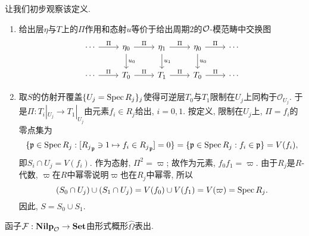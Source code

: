 让我们初步观察该定义.\begin{enumerate}
    \item 给出层$\eta$与$T$上的$\Pi$作用和态射$u$等价于给出周期$2$的$\mathcal{O}$-模范畴中交换图\[
    \begin{tikzcd}
    \cdots \arrow[r, "\Pi"] & \eta_0 \arrow[r, "\Pi"] \arrow[d, "u_0"] & \eta_1 \arrow[r, "\Pi"] \arrow[d, "u_1"] & \eta_0 \arrow[r, "\Pi"] \arrow[d, "u_0"] & \cdots \\
    \cdots \arrow[r, "\Pi"] & T_0 \arrow[r, "\Pi"]                     & T_1 \arrow[r, "\Pi"]                     & T_0 \arrow[r, "\Pi"]                     & \cdots
    \end{tikzcd}\]
    \item 取$S$的仿射开覆盖$\{U_j = \operatorname{Spec} R_j\}_j$使得可逆层$T_0$与$T_1$限制在$U_j$上同构于$\mathscr{O}_{U_j}$.
    于是$\Pi : T_i|_{U_j}\to T_1|_{U_j}$由元素$f_i\in R_j$给出, $i = 0, 1$. 按定义, 限制在$U_j$上, $\Pi = f_i$的零点集为\begin{align*}
        \{\mathfrak{p}\in\operatorname{Spec} R_j : [{R_j}_{\mathfrak{p}}\ni 1\mapsto f_i\in {R_j}_{\mathfrak{p}}] = 0\} = \{\mathfrak{p}\in\operatorname{Spec} R_j : f_i\in\mathfrak{p}\} = V(f_i),
    \end{align*}
    即$S_i\cap U_j = V(f_i)$. 作为态射, $\Pi^2 = \varpi$; 故作为元素, $f_0f_1 = \varpi$.
    由于$R_j$是$R$-代数, $\varpi$在$R$中幂零说明$\varpi$也在$R_j$中幂零, 所以\[(S_0\cap U_j)\cup(S_1\cap U_j) = V(f_0)\cup V(f_1) = V(\varpi) = \operatorname{Spec} R_j.\]
    因此, $S = S_0\cup S_1$.
\end{enumerate}

\begin{theorem}\label{hatOmega eq F}
    函子$\mathcal{F} : \mathbf{Nilp}_{\mathcal{O}}\to\mathbf{Set}$由形式概形$\hat{\Omega}$表出.
\end{theorem}

